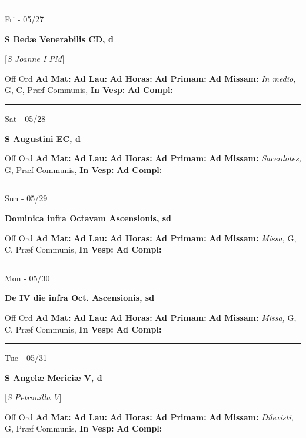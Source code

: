 \documentclass[letterpaper, 10pt]{article}
\begin{document}
\hrule
\begin{center}
Fri - 05/27
\end{center}\textbf{ \large S Bedæ Venerabilis CD, \textnormal{\normalsize d}}

[\textit{S Joanne I PM}]
\begin{justify}
Off Ord
\textbf{Ad Mat: }
\textbf{Ad Lau: }
\textbf{Ad Horas: }
\textbf{Ad Primam: }
\textbf{Ad Missam:} \textit{In medio, } G, C, Præf Communis, 
\textbf{In Vesp: }
\textbf{Ad Compl: }\end{justify}



\hrule
\begin{center}
Sat - 05/28
\end{center}\textbf{ \large S Augustini EC, \textnormal{\normalsize d}}
\begin{justify}
Off Ord
\textbf{Ad Mat: }
\textbf{Ad Lau: }
\textbf{Ad Horas: }
\textbf{Ad Primam: }
\textbf{Ad Missam:} \textit{Sacerdotes, } G, Præf Communis, 
\textbf{In Vesp: }
\textbf{Ad Compl: }\end{justify}



\hrule
\begin{center}
Sun - 05/29
\end{center}\textbf{ \large Dominica infra Octavam Ascensionis, \textnormal{\normalsize sd}}
\begin{justify}
Off Ord
\textbf{Ad Mat: }
\textbf{Ad Lau: }
\textbf{Ad Horas: }
\textbf{Ad Primam: }
\textbf{Ad Missam:} \textit{Missa, } G, C, Præf Communis, 
\textbf{In Vesp: }
\textbf{Ad Compl: }\end{justify}



\hrule
\begin{center}
Mon - 05/30
\end{center}\textbf{ \large De IV die infra Oct. Ascensionis, \textnormal{\normalsize sd}}
\begin{justify}
Off Ord
\textbf{Ad Mat: }
\textbf{Ad Lau: }
\textbf{Ad Horas: }
\textbf{Ad Primam: }
\textbf{Ad Missam:} \textit{Missa, } G, C, Præf Communis, 
\textbf{In Vesp: }
\textbf{Ad Compl: }\end{justify}



\hrule
\begin{center}
Tue - 05/31
\end{center}\textbf{ \large S Angelæ Mericiæ V, \textnormal{\normalsize d}}

[\textit{S Petronilla V}]
\begin{justify}
Off Ord
\textbf{Ad Mat: }
\textbf{Ad Lau: }
\textbf{Ad Horas: }
\textbf{Ad Primam: }
\textbf{Ad Missam:} \textit{Dilexisti, } G, Præf Communis, 
\textbf{In Vesp: }
\textbf{Ad Compl: }\end{justify}
\end{document}
